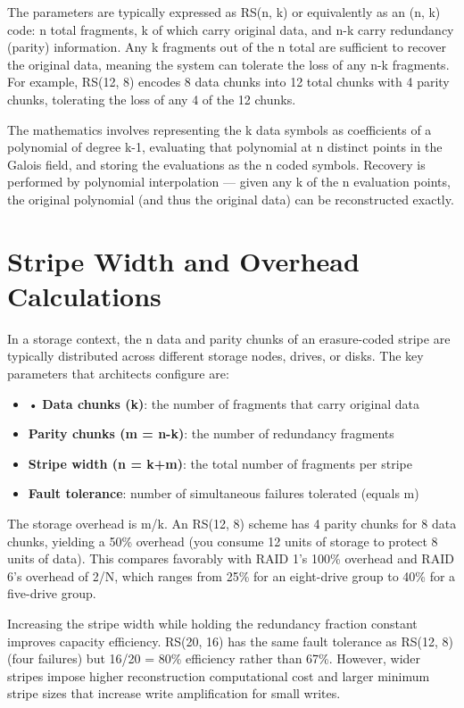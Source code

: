 The parameters are typically expressed as RS(n, k) or equivalently as an (n, k) code: n total fragments, k of which carry original data, and n-k carry redundancy (parity) information. Any k fragments out of the n total are sufficient to recover the original data, meaning the system can tolerate the loss of any n-k fragments. For example, RS(12, 8) encodes 8 data chunks into 12 total chunks with 4 parity chunks, tolerating the loss of any 4 of the 12 chunks.

The mathematics involves representing the k data symbols as coefficients of a polynomial of degree k-1, evaluating that polynomial at n distinct points in the Galois field, and storing the evaluations as the n coded symbols. Recovery is performed by polynomial interpolation --- given any k of the n evaluation points, the original polynomial (and thus the original data) can be reconstructed exactly.

\section{Stripe Width and Overhead Calculations}
In a storage context, the n data and parity chunks of an erasure-coded stripe are typically distributed across different storage nodes, drives, or disks. The key parameters that architects configure are:

\begin{itemize}
  \item • \textbf{Data chunks (k)}: the number of fragments that carry original data
  \item \textbf{Parity chunks (m = n-k)}: the number of redundancy fragments
  \item \textbf{Stripe width (n = k+m)}: the total number of fragments per stripe
  \item \textbf{Fault tolerance}: number of simultaneous failures tolerated (equals m)
\end{itemize}

The storage overhead is m/k. An RS(12, 8) scheme has 4 parity chunks for 8 data chunks, yielding a 50\% overhead (you consume 12 units of storage to protect 8 units of data). This compares favorably with RAID 1's 100\% overhead and RAID 6's overhead of 2/N, which ranges from 25\% for an eight-drive group to 40\% for a five-drive group.

Increasing the stripe width while holding the redundancy fraction constant improves capacity efficiency. RS(20, 16) has the same fault tolerance as RS(12, 8) (four failures) but 16/20 = 80\% efficiency rather than 67\%. However, wider stripes impose higher reconstruction computational cost and larger minimum stripe sizes that increase write amplification for small writes.

